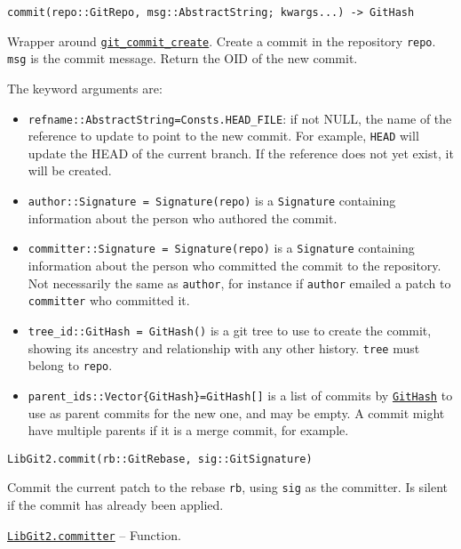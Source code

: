 \begin{adjustwidth}{2em}{0pt}


\begin{verbatim}
commit(repo::GitRepo, msg::AbstractString; kwargs...) -> GitHash
\end{verbatim}

Wrapper around \href{https://libgit2.org/libgit2/\#HEAD/group/commit/git\_commit\_create}{\texttt{git\_commit\_create}}. Create a commit in the repository \texttt{repo}. \texttt{msg} is the commit message. Return the OID of the new commit.

The keyword arguments are:

\begin{itemize}
\item \texttt{refname::AbstractString=Consts.HEAD\_FILE}: if not NULL, the name of the reference to update to point to the new commit. For example, \texttt{{\textquotedbl}HEAD{\textquotedbl}} will update the HEAD of the current branch. If the reference does not yet exist, it will be created.


\item \texttt{author::Signature = Signature(repo)} is a \texttt{Signature} containing information about the person who authored the commit.


\item \texttt{committer::Signature = Signature(repo)} is a \texttt{Signature} containing information about the person who committed the commit to the repository. Not necessarily the same as \texttt{author}, for instance if \texttt{author} emailed a patch to \texttt{committer} who committed it.


\item \texttt{tree\_id::GitHash = GitHash()} is a git tree to use to create the commit, showing its ancestry and relationship with any other history. \texttt{tree} must belong to \texttt{repo}.


\item \texttt{parent\_ids::Vector\{GitHash\}=GitHash[]} is a list of commits by \hyperlink{202290709580230708}{\texttt{GitHash}} to use as parent commits for the new one, and may be empty. A commit might have multiple parents if it is a merge commit, for example.

\end{itemize}



\begin{lstlisting}
LibGit2.commit(rb::GitRebase, sig::GitSignature)
\end{lstlisting}

Commit the current patch to the rebase \texttt{rb}, using \texttt{sig} as the committer. Is silent if the commit has already been applied.



\end{adjustwidth}
\hypertarget{4819166445750615913}{}
\hyperlink{4819166445750615913}{\texttt{LibGit2.committer}}  -- {Function.}

